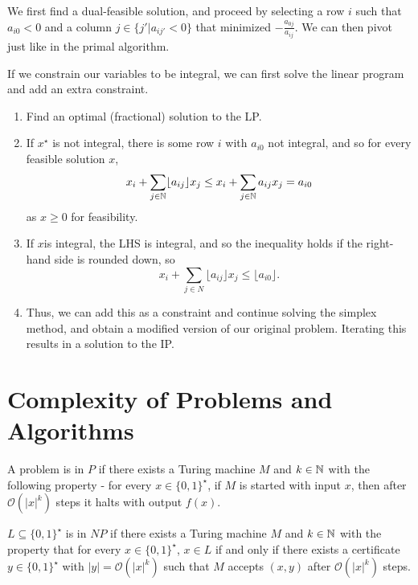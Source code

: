 \begin{defn}
  \label{sec:advanc-simpl-proc-2}
  We first find a dual-feasible solution, and proceed by selecting a
  row $i$ such that $a_{i0} < 0$ and a column $j \in \{ j' | a_{ij'} <
0 \} $ that minimized $-\frac{a_{0j}}{a_{ij}}$.  We can then pivot
just like in the primal algorithm.
\end{defn}

\begin{thm}
  If we constrain our variables to be integral, we can first solve the
  linear program and add an extra constraint.
  \begin{enumerate}
  \item Find an optimal (fractional) solution to the LP.
  \item If $x^{\star}$ is not integral, there is some row $i$ with
    $a_{i0}$ not integral, and so for every feasible solution $x$,
    \begin{equation}
      \label{eq:20}
      x_{i} + \sum_{j \in \mathbb{N}} \lfloor a_{ij} \rfloor x_{j} \leq x_{i} +
      \sum_{j \in \mathbb{N}} a_{ij} x_{j} = a_{i0}
    \end{equation} as $x \geq 0$ for feasibility.
  \item If $x$is integral, the LHS is integral, and so the inequality
    holds if the right-hand side is rounded down, so
    \begin{equation}
      x_{i} + \sum_{j \in N} \lfloor a_{ij} \rfloor x_{j} \leq \lfloor a_{i0} \rfloor.
    \end{equation}
  \item Thus, we can add this as a constraint and continue solving the
    simplex method, and obtain a modified version of our original
    problem.  Iterating this results in a solution to the IP.
  \end{enumerate}
\end{thm}

\section{Complexity of Problems and Algorithms}
\label{sec:compl-probl-algor}

\begin{defn}
  \label{sec:compl-probl-algor-1}
  A problem is in $P$ if there exists a Turing machine $M$ and $k \in
  \mathbb{N}$ with the following property - for every $x \in \{ 0, 1
  \}^{\star}$, if $M$ is started with input $x$, then after
  $\mathcal{O}(|x|^{k})$ steps it halts with output $f(x)$.

  $L \subseteq \{ 0, 1 \}^{\star} $ is in $NP$ if there exists a
  Turing machine $M$ and $k \in \mathbb{N}$ with the property that for every
  $x \in \{ 0, 1 \}^{\star} $, $x \in L$ if and only if there exists a
  certificate $y \in \{ 0, 1 \}^{\star} $ with $|y| =
  \mathcal{O}(|x|^{k})$ such that $M$ accepts $(x, y)$ after
  $\mathcal{O}(|x|^{k})$ steps.
\end{defn}

